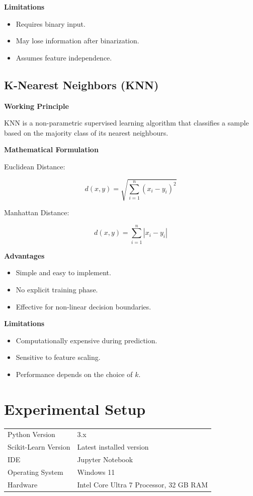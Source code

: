 \documentclass{article}
\begin{document}
\textbf{Limitations}

\begin{itemize}
\item Requires binary input.
\item May lose information after binarization.
\item Assumes feature independence.
\end{itemize}

\subsection{K-Nearest Neighbors (KNN)}

\textbf{Working Principle}

KNN is a non-parametric supervised learning algorithm that classifies a sample based on the majority class of its nearest neighbours.

\textbf{Mathematical Formulation}

Euclidean Distance:

\[
d(x,y)=\sqrt{\sum_{i=1}^{n}(x_i-y_i)^2}
\]

Manhattan Distance:

\[
d(x,y)=\sum_{i=1}^{n}|x_i-y_i|
\]

\textbf{Advantages}

\begin{itemize}
\item Simple and easy to implement.
\item No explicit training phase.
\item Effective for non-linear decision boundaries.
\end{itemize}

\textbf{Limitations}

\begin{itemize}
\item Computationally expensive during prediction.
\item Sensitive to feature scaling.
\item Performance depends on the choice of \(k\).
\end{itemize}

\section{Experimental Setup}

\begin{table}[H]
\centering
\begin{tabular}{ll}
\toprule
Python Version & 3.x \\
Scikit-Learn Version & Latest installed version \\
IDE & Jupyter Notebook \\
Operating System & Windows 11 \\
Hardware & Intel Core Ultra 7 Processor, 32 GB RAM \\
\bottomrule
\end{tabular}
\end{table}
\end{document}
